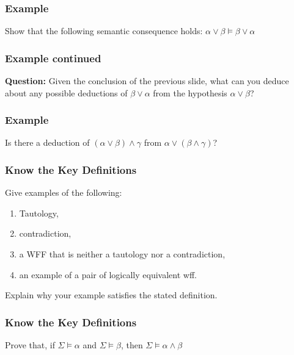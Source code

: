 \documentclass{beamer}
\begin{document}
\begin{frame}
	\frametitle{Example}
	
	Show that the following semantic consequence holds: $\alpha \lor \beta \vDash \beta \lor \alpha$
	
	\vspace{7cm}
	
\end{frame}

\begin{frame}
	\frametitle{Example continued}
	
	{\bf Question:} Given the conclusion of the previous slide, what can you deduce about any possible deductions of $\beta \lor \alpha$ from the hypothesis $\alpha \lor \beta$?
	
	\vspace{7cm}
	
\end{frame}

\begin{frame}
	\frametitle{Example}
	
	Is there a deduction of $(\alpha \lor \beta) \land \gamma$ from $\alpha \lor (\beta \land \gamma)$?
	
	\vspace{7cm}
	
	
\end{frame}

\begin{frame}
	\frametitle{Know the Key Definitions}
	
	Give examples of the following: 
	
	\begin{enumerate}
		\item Tautology, 
		\item contradiction, 
		\item a WFF that is neither a tautology nor a contradiction,
		\item an example of a pair of logically equivalent wff.
	\end{enumerate}

	\vspace{1cm}

	Explain why your example satisfies the stated definition. 
	
\end{frame}

\begin{frame}
	\frametitle{Know the Key Definitions}
	
	Prove that, if $\Sigma \vDash \alpha$ and $\Sigma \vDash \beta$, then $\Sigma \vDash \alpha \land \beta$
	
	\vspace{7cm}
	
\end{frame}
\end{document}
